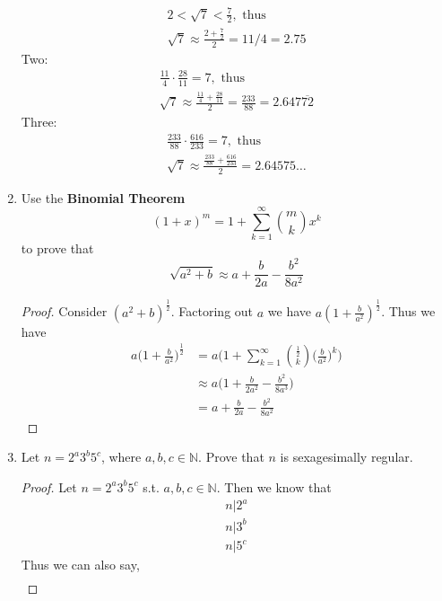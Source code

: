 \documentclass[12pt]{article}
\begin{document}
\begin{enumerate}
\begin{tasks}
\begin{gather*}
                2 < \sqrt{7} < \frac{7}{2}, \text{ thus} \\
                \sqrt{7} \approx \frac{2+\frac{7}{2}}{2}=11/4=2.75
            \end{gather*}
            Two:
            \begin{gather*}
                \frac{11}{4}\cdot\frac{28}{11}=7, \text{ thus} \\
                \sqrt{7} \approx \frac{\frac{11}{4}+\frac{28}{11}}{2}=\frac{233}{88}=2.647\overline{72}
            \end{gather*}
            Three: 
            \begin{gather*}
                \frac{233}{88}\cdot\frac{616}{233}=7, \text{ thus} \\
                \sqrt{7} \approx \frac{\frac{233}{88}+\frac{616}{233}}{2}=2.64575\dots
            \end{gather*}
        \end{tasks}
        \pagebreak
        \item Use the \textbf{Binomial Theorem}
        \[{(1+x)}^m=1+\sum_{k=1}^{\infty}\binom{m}{k}x^k\] 
        to prove that
        \[\sqrt{a^2+b}\approx a+ \frac{b}{2a}-\frac{b^2}{8a^2}\]
        \begin{proof}
            Consider ${(a^2+b)}^{\frac{1}{2}}$. Factoring out $a$ we have $a{(1+\frac{b}{a^2})}^{\frac{1}{2}}$. Thus we have
            \begin{align*}
                a{\bigg(1+\frac{b}{a^2}\bigg)}^\frac{1}{2}&= a\bigg(1+\sum_{k=1}^{\infty}\binom{\frac{1}{2}}{k}\bigg(\frac{b}{a^2}\bigg)^k\bigg) \\
                &\approx a\bigg(1+\frac{b}{2a^2}-\frac{b^2}{8a^3}\bigg) \\
                &=a+\frac{b}{2a}-\frac{b^2}{8a^2}
            \end{align*}
        \end{proof}
        \item Let $n=2^a3^b5^c$, where $a,b,c\in \mathbb{N}$. Prove that $n$ is sexagesimally regular.
        \begin{proof}
            Let $n=2^a3^b5^c$ s.t. $a,b,c\in\mathbb{N}$. Then we know that
            \begin{gather*}
                n|2^a \\
                n|3^b \\
                n|5^c
            \end{gather*}
            Thus we can also say,
            \begin{gather*}

\end{gather*}
\end{proof}
\end{enumerate}
\end{document}
